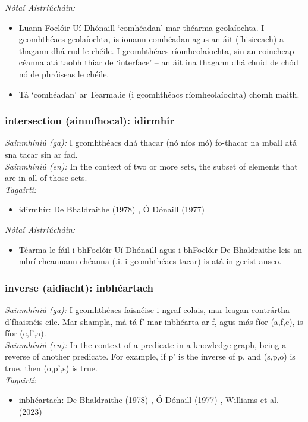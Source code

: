  \noindent \textit{Nótaí Aistriúcháin:}
\begin{itemize}
	\item Luann Foclóir Uí Dhónaill `comhéadan' mar théarma geolaíochta. I gcomhthéacs geolaíochta, is ionann comhéadan agus an áit (fhisiceach) a thagann dhá rud le chéile. I gcomhthéacs ríomheolaíochta, sin an coincheap céanna atá taobh thiar de `interface' -- an áit ina thagann dhá chuid de chód nó de phróiseas le chéile.
	\item Tá `comhéadan' ar Tearma.ie (i gcomhthéacs ríomheolaíochta) chomh maith.
\end{itemize}


\subsubsection*{intersection (ainmfhocal): idirmhír}
 \noindent \textit{Sainmhíniú (ga):} I gcomhthéacs dhá thacar (nó níos mó) fo-thacar na mball atá sna tacar sin ar fad.
\\
 \noindent \textit{Sainmhíniú (en):} In the context of two or more sets, the subset of elements that are in all of those sets.
\\
 \noindent \textit{Tagairtí:}
\begin{itemize}
	\item idirmhír: De Bhaldraithe (1978) \cite{de-bhaldraithe}, Ó Dónaill (1977) \cite{odonaill}
\end{itemize}

 \noindent \textit{Nótaí Aistriúcháin:}
\begin{itemize}
	\item Téarma le fáil i bhFoclóir Uí Dhónaill agus i bhFoclóir De Bhaldraithe leis an mbrí cheannann chéanna (.i. i gcomhthéacs tacar) is atá in gceist anseo.
\end{itemize}


\subsubsection*{inverse (aidiacht): inbhéartach}
 \noindent \textit{Sainmhíniú (ga):} I gcomhthéacs faisnéise i ngraf eolais, mar leagan contrártha d'fhaisnéis eile. Mar shampla, má tá f' mar inbhéarta ar f, agus más fíor (a,f,c), is fíor (c,f',a).
\\
 \noindent \textit{Sainmhíniú (en):} In the context of a predicate in a knowledge graph, being a reverse of another predicate. For example, if p' is the inverse of p, and (s,p,o) is true, then (o,p',s) is true.
\\
 \noindent \textit{Tagairtí:}
\begin{itemize}
	\item inbhéartach: De Bhaldraithe (1978) \cite{de-bhaldraithe}, Ó Dónaill (1977) \cite{odonaill}, Williams et al. (2023) \cite{storchiste}
\end{itemize}


